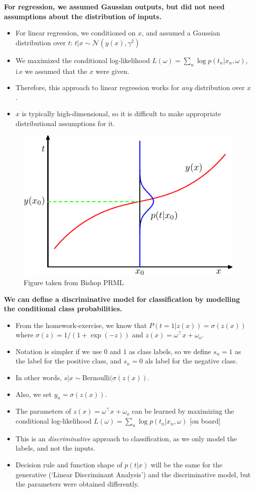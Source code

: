 \textbf{For regression, we assumed Gaussian outputs, but did not need assumptions about the distribution of inputs.}
\begin{itemize}
\item For linear regression, we conditioned on $x$, and assumed a Gaussian distribution over $t$: $t|x \sim \mathcal{N}(y(x), \gamma^2)$
\item  We maximized the conditional log-likelihood $L(\omega)=\sum_n \log p(t_n|x_n, \omega)$, i.e we assumed that the $x$ were given.
\item  Therefore, this approach to linear regression works for \emph{any} distribution over $x$.
\item $x$ is typically high-dimensional, so it is difficult to make appropriate distributional assumptions for it. 
\end{itemize}

\begin{figure}
	\centering
	\includegraphics[width=.4\textwidth]{./lecture7/Figure128.pdf}
	\caption{Figure taken from Bishop PRML}
\end{figure}


\textbf{We can define a discriminative model for classification by modelling the conditional class probabilities.}
\begin{itemize}
\item From the homework-exercise, we know that $P(t=1 | z(x))=\sigma(z(x))$ where $\sigma(z)=1/(1+\exp(-z))$ and $z(x)=
\omega^\top x+\omega_o$.
\item Notation is simpler if we use $0$ and $1$ as class labels, so we define $s_n=1$ as the label for the positive class, and $s_n=0$ als label for the negative class.
\item In other words, $s |x \sim \mbox{Bernoulli}(\sigma(z(x))$.
\item Also, we set $y_n=\sigma(z(x))$.
\item  The parameters of $z(x)=\omega^\top x+ \omega_o$ can be learned by maximizing the conditional log-likelihood $L(\omega)=\sum_n \log p(t_n|x_n, \omega)$ [on board]
\item  This is an \emph{discriminative} approach to classification, as we only model the labels, and not the inputs.
\item 
 Decision rule and function shape of $p(t|x)$ will be the same for the generative (`Linear Discriminant Analysis') and the discriminative model, but the parameters were obtained differently.
\end{itemize}

